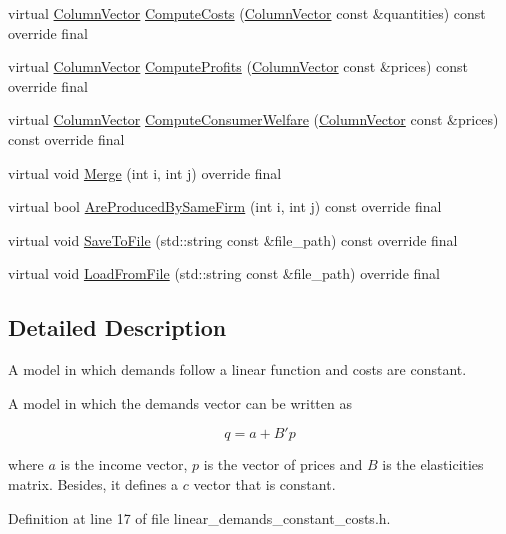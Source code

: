 \begin{DoxyCompactItemize}
\item 
virtual \hyperlink{classColumnVector}{Column\+Vector} \hyperlink{classLinearDemandsConstantCosts_a74f907b4737865de086c8aa1f125d7c8}{Compute\+Costs} (\hyperlink{classColumnVector}{Column\+Vector} const \&quantities) const override final
\item 
virtual \hyperlink{classColumnVector}{Column\+Vector} \hyperlink{classLinearDemandsConstantCosts_a48b52dab01d2cf45beae51eab615f7ae}{Compute\+Profits} (\hyperlink{classColumnVector}{Column\+Vector} const \&prices) const override final
\item 
virtual \hyperlink{classColumnVector}{Column\+Vector} \hyperlink{classLinearDemandsConstantCosts_a9d3fa6a3b151c2f1703f23bbee6954cb}{Compute\+Consumer\+Welfare} (\hyperlink{classColumnVector}{Column\+Vector} const \&prices) const override final
\item 
virtual void \hyperlink{classLinearDemandsConstantCosts_a0ee422d927b5a85f9aba8782b02f537b}{Merge} (int i, int j) override final
\item 
virtual bool \hyperlink{classLinearDemandsConstantCosts_a91ba117b740d0e5cb5d6efd63d61a5f6}{Are\+Produced\+By\+Same\+Firm} (int i, int j) const override final
\item 
virtual void \hyperlink{classLinearDemandsConstantCosts_aef2823751866a4933a8611dd4622d78b}{Save\+To\+File} (std\+::string const \&file\+\_\+path) const override final
\item 
virtual void \hyperlink{classLinearDemandsConstantCosts_a075add461e368629b9dfd8f72033e2ad}{Load\+From\+File} (std\+::string const \&file\+\_\+path) override final
\end{DoxyCompactItemize}


\subsection{Detailed Description}
A model in which demands follow a linear function and costs are constant. 

A model in which the demands vector can be written as

\begin{equation} q = a + B' p \end{equation}

where $ a $ is the income vector, $ p $ is the vector of prices and $ B $ is the elasticities\textquotesingle{} matrix. Besides, it defines a $ c $ vector that is constant. 

Definition at line 17 of file linear\+\_\+demands\+\_\+constant\+\_\+costs.\+h.



